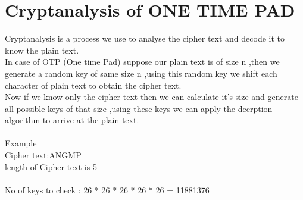 \documentclass[11pt]{article}
\begin{document}
\section{\textbf{Cryptanalysis of ONE TIME PAD}}
Cryptanalysis is a process we use to analyse the cipher text and decode it to know the plain text.\\
In case of OTP (One time Pad) suppose our plain text is of size n ,then we generate a random key of same size n
,using this random key we shift each character of plain text to obtain the cipher text.\\
Now if we know only the cipher text then we can calculate it's size and generate all possible keys of that size ,using these keys we can apply the decrption algorithm to arrive at the plain text.
\\
\\
Example\\ 
Cipher text:ANGMP\\
length of Cipher text is 5\\
\\
No of keys to check : 26 * 26 * 26 * 26 * 26 = 11881376 
\end{document}
